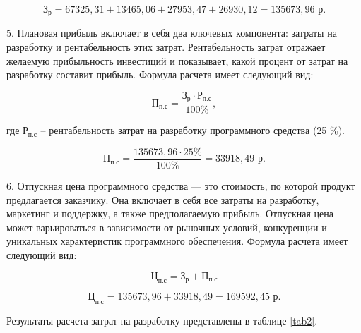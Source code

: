 $$
 \text{З}_{\text{р}} = 67325,31+13465,06+27953,47+26930,12 = 135673,96 \text{ р}.
$$

5. Плановая прибыль включает в себя два ключевых компонента: затраты на разработку и рентабельность этих затрат. Рентабельность затрат отражает желаемую прибыльность инвестиций и показывает, какой процент от затрат на разработку составит прибыль. Формула расчета имеет следующий вид:

\begin{equation}
    \text{П}_{\text{п.с}} = \frac{\text{З}_{\text{р}} \cdot \text{Р}_{\text{п.с}}}{100\%},
\end{equation}

где $\text{Р}_{\text{п.с}}$ -- рентабельность затрат на разработку программного средства (25 \%).

$$
 \text{П}_{\text{п.с}} = \frac{135673,96 \cdot 25\%}{100\%} = 33918,49 \text{ р}.
$$

6. Отпускная цена программного средства — это стоимость, по которой продукт предлагается заказчику. Она включает в себя все затраты на разработку, маркетинг и поддержку, а также предполагаемую прибыль. Отпускная цена может варьироваться в зависимости от рыночных условий, конкуренции и уникальных характеристик программного обеспечения. Формула расчета имеет следующий вид:

\begin{equation}
    \text{Ц}_{\text{п.с}} = \text{З}_{\text{р}} + \text{П}_{\text{п.с}}
\end{equation}

$$
 \text{Ц}_{\text{п.с}} = 135673,96 + 33918,49 = 169592,45 \text{ р}.
$$


Результаты расчета затрат на разработку представлены в таблице \ref{tab2}.

